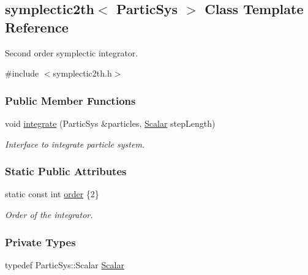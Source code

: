 \hypertarget{classsymplectic2th}{}\subsection{symplectic2th$<$ Partic\+Sys $>$ Class Template Reference}
\label{classsymplectic2th}


Second order symplectic integrator.  




{\ttfamily \#include $<$symplectic2th.\+h$>$}

\subsubsection*{Public Member Functions}
\begin{DoxyCompactItemize}
\item 
void \mbox{\hyperlink{classsymplectic2th_ade78f67685ed50280a210e67397af092}{integrate}} (Partic\+Sys \&particles, \mbox{\hyperlink{classsymplectic2th_a08d72f435fb4c69320ead95ba05625a1}{Scalar}} step\+Length)
\begin{DoxyCompactList}\small\item\em Interface to integrate particle system. \end{DoxyCompactList}\end{DoxyCompactItemize}
\subsubsection*{Static Public Attributes}
\begin{DoxyCompactItemize}
\item 
static const int \mbox{\hyperlink{classsymplectic2th_a1082d668c1081ff0116e8816f1240fcd}{order}} \{2\}
\begin{DoxyCompactList}\small\item\em Order of the integrator. \end{DoxyCompactList}\end{DoxyCompactItemize}
\subsubsection*{Private Types}
\begin{DoxyCompactItemize}
\item 
typedef Partic\+Sys\+::\+Scalar \mbox{\hyperlink{classsymplectic2th_a08d72f435fb4c69320ead95ba05625a1}{Scalar}}
\end{DoxyCompactItemize}


